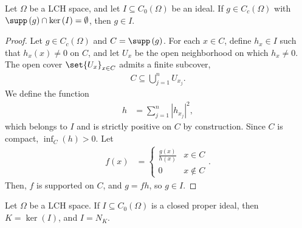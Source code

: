 \documentclass[10pt]{mypackage}
\begin{document}
\begin{lemma}
  Let $\Omega$ be a LCH space, and let $I\subseteq C_0\left(\Omega\right)$ be an ideal. If $g\in C_c\left(\Omega\right)$ with $\supp\left(g\right)\cap \ker\left(I\right) = \emptyset$, then $g\in I$.
\end{lemma}
\begin{proof}
  Let $g\in C_c\left(\Omega\right)$ and $C = \supp\left(g\right)$. For each $x\in C$, define $h_x\in I$ such that $h_x\left(x\right) \neq 0$ on $C$, and let $U_x$ be the open neighborhood on which $h_x \neq 0$. The open cover $\set{U_x}_{x\in C}$ admits a finite subcover,
  \begin{align*}
    C\subseteq \bigcup_{j=1}^{n}U_{x_j}.
  \end{align*}
  We define the function
  \begin{align*}
    h &= \sum_{j=1}^{n}\left\vert h_{x_j} \right\vert^2,
  \end{align*}
  which belongs to $I$ and is strictly positive on $C$ by construction. Since $C$ is compact, $\inf_{C}\left(h\right) > 0$. Let
  \begin{align*}
    f(x) &= \begin{cases}
      \frac{g(x)}{h(x)} & x\in C\\
      0 & x\notin C
    \end{cases}.
  \end{align*}
  Then, $f$ is supported on $C$, and $g = fh$, so $g\in I$.
\end{proof}
\begin{proposition}
  Let $\Omega$ be a LCH space. If $I\subseteq C_0\left(\Omega\right)$ is a closed proper ideal, then $K = \ker\left(I\right)$, and $I = N_K$.
\end{proposition}
\end{document}
